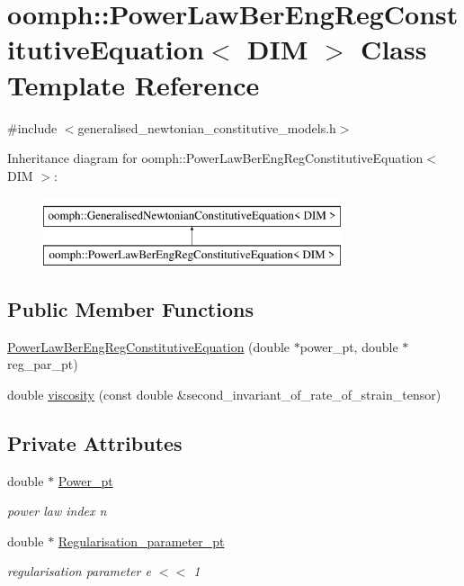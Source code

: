 \hypertarget{classoomph_1_1PowerLawBerEngRegConstitutiveEquation}{}\section{oomph\+:\+:Power\+Law\+Ber\+Eng\+Reg\+Constitutive\+Equation$<$ D\+IM $>$ Class Template Reference}
\label{classoomph_1_1PowerLawBerEngRegConstitutiveEquation}


{\ttfamily \#include $<$generalised\+\_\+newtonian\+\_\+constitutive\+\_\+models.\+h$>$}

Inheritance diagram for oomph\+:\+:Power\+Law\+Ber\+Eng\+Reg\+Constitutive\+Equation$<$ D\+IM $>$\+:\begin{figure}[H]
\begin{center}
\leavevmode
\includegraphics[height=2.000000cm]{classoomph_1_1PowerLawBerEngRegConstitutiveEquation}
\end{center}
\end{figure}
\subsection*{Public Member Functions}
\begin{DoxyCompactItemize}
\item 
\hyperlink{classoomph_1_1PowerLawBerEngRegConstitutiveEquation_af60b42c2f688e029aaaf7011aefda323}{Power\+Law\+Ber\+Eng\+Reg\+Constitutive\+Equation} (double $\ast$power\+\_\+pt, double $\ast$reg\+\_\+par\+\_\+pt)
\item 
double \hyperlink{classoomph_1_1PowerLawBerEngRegConstitutiveEquation_a9f98f9120f7fe2aa6813098a946459de}{viscosity} (const double \&second\+\_\+invariant\+\_\+of\+\_\+rate\+\_\+of\+\_\+strain\+\_\+tensor)
\end{DoxyCompactItemize}
\subsection*{Private Attributes}
\begin{DoxyCompactItemize}
\item 
double $\ast$ \hyperlink{classoomph_1_1PowerLawBerEngRegConstitutiveEquation_ac69a79185f6ca3b4e467a5fd2489914f}{Power\+\_\+pt}
\begin{DoxyCompactList}\small\item\em power law index n \end{DoxyCompactList}\item 
double $\ast$ \hyperlink{classoomph_1_1PowerLawBerEngRegConstitutiveEquation_af8832a1d0907a61e327f4335e28b95dd}{Regularisation\+\_\+parameter\+\_\+pt}
\begin{DoxyCompactList}\small\item\em regularisation parameter e $<$$<$ 1 \end{DoxyCompactList}\end{DoxyCompactItemize}


